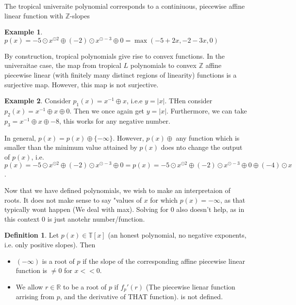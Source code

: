 \documentclass[11pt]{article}
\theoremstyle{definition}
\newtheorem{protoexample}{Example}[section]
\newenvironment{ex}
   {\begin{protoexample}}
   {\end{protoexample}}
\newtheorem{protodefinition}{Definition}[section]
\newenvironment{define}
   {\begin{protodefinition}}
   {\end{protodefinition}}
\def\ZZ{{\mathbb Z}}
\def\RR{{\mathbb R}}
\def\TT{{\mathbb T}}
\begin{document}
The tropical univeraite polynomial corresponds to a continiuous, piecewise affine linear function with $\ZZ$-slopes


\begin{ex}
    $p(x) =  -5\odot x^{\odot 2} \oplus (-2)\odot x^{\odot -3} \oplus 0= \max (-5+2x, -2-3x, 0)$
\end{ex}


By construction, tropical polynomials give rise to convex functions. In the univeraitae case, the map from tropical $L$ polynomials to convex $\ZZ$ affine piecewise linear (with finitely many distinct regions of linearity) functions is a surjective map. However, this map is not surjective.

\begin{ex}
    Consider $p_1(x) = x^{-1} \oplus x$, i.e.e $y = |x|$. THen consider $p_2(x) = x^{-1} \oplus x \oplus 0$. Then we once again get $y=|x|$. Furthermore, we can take $p_{3}=x^{-1} \oplus x \oplus -8$, this works for any negative number.


    In general, $p(x) = p(x) \oplus \{-\infty\}$. However, $p(x) \oplus$ any function which is smaller than the minimum value attained by $p(x)$ does nto change the output of $p(x)$, i.e.  $p(x) =  -5\odot x^{\odot 2} \oplus (-2)\odot x^{\odot -3} \oplus 0= p(x) =  -5\odot x^{\odot 2} \oplus (-2)\odot x^{\odot -3} \oplus 0 \oplus (-4)\odot x$.
\end{ex}

Now that we have defined polynomials, we wish to make an interpretaion of roots. It does not make sense to say "values of $x$ for which $p(x)= - \infty$, as that typically wont happen (We deal with max). Solving for $0$ also doesn't help, as in this context $0$ is just anotehr number/function.



\begin{define}
    Let $p(x) \in \TT[x]$ (an honest polynomial, no negative exponents, i.e. only positive slopes). Then
    \begin{itemize}
        \item $(-\infty)$ is a root of $p$ if the slope of the corresponding affine piecewise linear function is $\neq 0$ for $x <<0$.
        \item We allow $r \in \RR$ to be a root of $p$ if $f_p'(r)$ (The piecewise lienar function arrising from $p$, and the derivative of THAT function). is not defined.
    \end{itemize}
\end{define}
\end{document}
